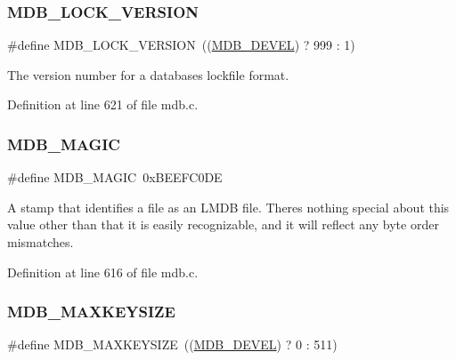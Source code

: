 \subsubsection{\texorpdfstring{M\+D\+B\+\_\+\+L\+O\+C\+K\+\_\+\+V\+E\+R\+S\+I\+ON}{MDB\_LOCK\_VERSION}}
{\footnotesize\ttfamily \#define M\+D\+B\+\_\+\+L\+O\+C\+K\+\_\+\+V\+E\+R\+S\+I\+ON~((\mbox{\hyperlink{group__compat_ga103b045068a1d21bf2347a7342f8f486}{M\+D\+B\+\_\+\+D\+E\+V\+EL}}) ? 999 \+: 1)}

The version number for a database\textquotesingle{}s lockfile format. 

Definition at line 621 of file mdb.\+c.

\mbox{\label{group__internal_ga4cac6326c08147a019e8ddb17ad712f6}} 
\subsubsection{\texorpdfstring{M\+D\+B\+\_\+\+M\+A\+G\+IC}{MDB\_MAGIC}}
{\footnotesize\ttfamily \#define M\+D\+B\+\_\+\+M\+A\+G\+IC~0x\+B\+E\+E\+F\+C0\+DE}

A stamp that identifies a file as an L\+M\+DB file. There\textquotesingle{}s nothing special about this value other than that it is easily recognizable, and it will reflect any byte order mismatches. 

Definition at line 616 of file mdb.\+c.

\mbox{\label{group__internal_gac929399f5d93cef85f874b9e9b1d09e0}} 
\subsubsection{\texorpdfstring{M\+D\+B\+\_\+\+M\+A\+X\+K\+E\+Y\+S\+I\+ZE}{MDB\_MAXKEYSIZE}}
{\footnotesize\ttfamily \#define M\+D\+B\+\_\+\+M\+A\+X\+K\+E\+Y\+S\+I\+ZE~((\mbox{\hyperlink{group__compat_ga103b045068a1d21bf2347a7342f8f486}{M\+D\+B\+\_\+\+D\+E\+V\+EL}}) ? 0 \+: 511)}



